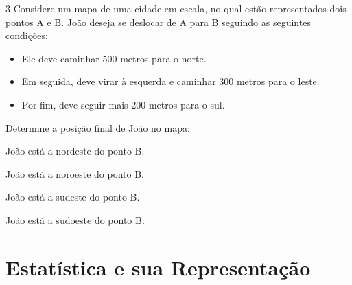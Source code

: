 \num{3} Considere um mapa de uma cidade em escala, no qual estão
representados dois pontos A e B. João deseja se deslocar de A para B
seguindo as seguintes condições:

\begin{itemize}
\item Ele deve caminhar 500 metros para o norte. 
\item Em seguida, deve virar à esquerda e caminhar 300 metros para o leste. 
\item Por fim, deve seguir mais 200 metros para o sul.
\end{itemize}

Determine a posição final de João no mapa:

\begin{escolha}[itemsep=0pt]
\item João está a nordeste do ponto B.
\item João está a noroeste do ponto B.
\item João está a sudeste do ponto B.
\item João está a sudoeste do ponto B.
\end{escolha}


\chapter{Estatística e sua
Representação}

